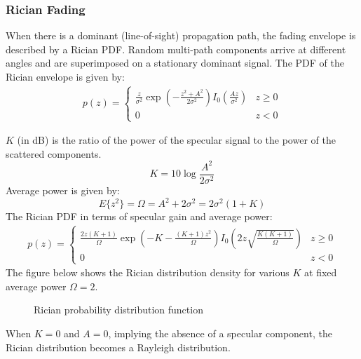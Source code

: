 \subsubsection{Rician Fading}
When there is a dominant (line-of-sight) propagation path, the fading envelope is described by a Rician \gls{PDF}\cite{AWGN}. Random multi-path components arrive at different angles and are superimposed on a stationary dominant signal. The \gls{PDF} of the Rician envelope is given by:
\begin{align*}
	p(z) =
	\begin{cases}
		\frac{z}{\sigma^2} \exp \left(-\frac{z^2 + A^2}{2\sigma^2}\right)I_0\left(\frac{Az}{\sigma^2}\right) & z \geq 0 \\
		0 & z < 0
	\end{cases}
\end{align*}
\begin{mathDef}
\end{mathDef}
\(K\) (in dB) is the ratio of the power of the specular signal to the power of the scattered components\cite{Hindu}.
\[
	K = 10 \log \frac{A^2}{2\sigma^2}
\]
Average power is given by:
\[
	E\{z^2\} = \Omega = A^2 + 2\sigma^2 = 2\sigma^2(1 + K)
\]
The Rician \gls{PDF} in terms of specular gain and average power:
\begin{align*}
	p(z) =
	\begin{cases}
		\frac{2z(K+1)}{\Omega} \exp \left(-K-\frac{(K+1)z^2}{\Omega}\right)I_0\left(2z\sqrt{\frac{K(K+1)}{\Omega}}\right) & z \geq 0 \\
		0 & z < 0
	\end{cases}
\end{align*}
The figure below shows the Rician distribution density for various \(K\) at fixed average power \(\Omega = 2\).
\begin{figure}[!h]
	\centering
	\resizebox{0.8\textwidth}{!}{}
	\caption{Rician probability distribution function}
\end{figure}

When \(K=0\) and \(A=0\), implying the absence of a specular component, the Rician distribution becomes a Rayleigh distribution.

